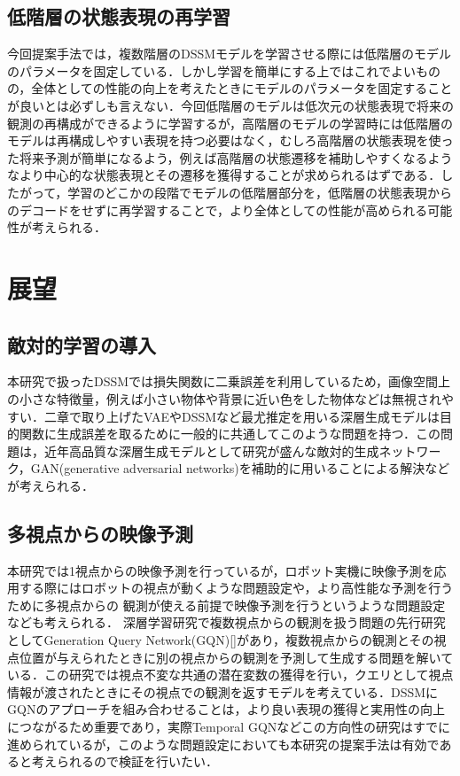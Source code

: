 \subsection{低階層の状態表現の再学習}
今回提案手法では，複数階層のDSSMモデルを学習させる際には低階層のモデルのパラメータを固定している．しかし学習を簡単にする上ではこれでよいものの，全体としての性能の向上を考えたときにモデルのパラメータを固定することが良いとは必ずしも言えない．今回低階層のモデルは低次元の状態表現で将来の観測の再構成ができるように学習するが，高階層のモデルの学習時には低階層のモデルは再構成しやすい表現を持つ必要はなく，むしろ高階層の状態表現を使った将来予測が簡単になるよう，例えば高階層の状態遷移を補助しやすくなるようなより中心的な状態表現とその遷移を獲得することが求められるはずである．したがって，学習のどこかの段階でモデルの低階層部分を，低階層の状態表現からのデコードをせずに再学習することで，より全体としての性能が高められる可能性が考えられる．

\section{展望}
\subsection{敵対的学習の導入}
本研究で扱ったDSSMでは損失関数に二乗誤差を利用しているため，画像空間上の小さな特徴量，例えば小さい物体や背景に近い色をした物体などは無視されやすい．二章で取り上げたVAEやDSSMなど最尤推定を用いる深層生成モデルは目的関数に生成誤差を取るために一般的に共通してこのような問題を持つ．この問題は，近年高品質な深層生成モデルとして研究が盛んな敵対的生成ネットワーク，GAN(generative adversarial networks)を補助的に用いることによる解決などが考えられる．

\subsection{多視点からの映像予測}
本研究では1視点からの映像予測を行っているが，ロボット実機に映像予測を応用する際にはロボットの視点が動くような問題設定や，より高性能な予測を行うために多視点からの
観測が使える前提で映像予測を行うというような問題設定なども考えられる．
深層学習研究で複数視点からの観測を扱う問題の先行研究としてGeneration Query Network(GQN)[]があり，複数視点からの観測とその視点位置が与えられたときに別の視点からの観測を予測して生成する問題を解いている．この研究では視点不変な共通の潜在変数の獲得を行い，クエリとして視点情報が渡されたときにその視点での観測を返すモデルを考えている．DSSMにGQNのアプローチを組み合わせることは，より良い表現の獲得と実用性の向上につながるため重要であり，実際Temporal GQNなどこの方向性の研究はすでに進められているが，このような問題設定においても本研究の提案手法は有効であると考えられるので検証を行いたい．

